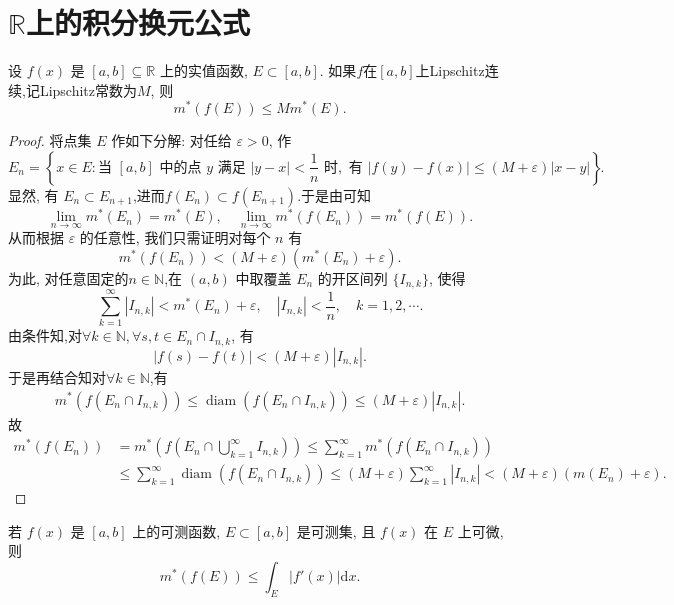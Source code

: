 \documentclass[../../main.tex]{subfiles}%
\begin{document}
\section{$\mathbb{R}$上的积分换元公式}

\begin{lemma}\label{lemma:实变函数--引理5.19}
设 $f(x)$ 是 $[a,b]\subseteq \mathbb{R}$ 上的实值函数, $E\subset[a,b]$. 如果$f$在$[a,b]$上Lipschitz连续,记Lipschitz常数为$M$, 则
\[
m^*(f(E)) \leqslant Mm^*(E). 
\]
\end{lemma}
\begin{proof}
将点集 $E$ 作如下分解: 对任给 $\varepsilon>0$, 作
\[
E_n = \left\{x\in E: \text{当 } [a,b] \text{ 中的点 } y \text{ 满足 } |y-x|<\frac{1}{n} \text{ 时}, \text{ 有 } |f(y)-f(x)|\leqslant(M+\varepsilon)|x-y|\right\}.
\]
显然, 有 $E_n\subset E_{n+1}$,进而$f(E_n)\subset f(E_{n+1})$.于是由可知
\[
\lim_{n\to\infty}m^*(E_n) = m^*(E), \quad \lim_{n\to\infty}m^*(f(E_n)) = m^*(f(E)).
\]
从而根据 $\varepsilon$ 的任意性, 我们只需证明对每个 $n$ 有
\[
m^*(f(E_n)) < (M+\varepsilon)(m^*(E_n)+\varepsilon).
\]
为此, 对任意固定的$n\in \mathbb{N}$,在 $(a,b)$ 中取覆盖 $E_n$ 的开区间列 $\{I_{n,k}\}$, 使得
\[
\sum_{k=1}^{\infty} |I_{n,k}| < m^*(E_n)+\varepsilon, \quad |I_{n,k}| < \frac{1}{n}, \quad k=1,2,\cdots.
\]
由条件知,对$\forall k\in \mathbb{N},\forall s,t\in E_n\cap I_{n,k}$, 有
\[
|f(s)-f(t)| < (M+\varepsilon)|I_{n,k}|.
\]
于是再结合知对$\forall k\in \mathbb{N}$,有
\begin{align*}
m^*(f(E_n\cap I_{n,k}))\leqslant \operatorname{diam}(f(E_n\cap I_{n,k})) 
\leqslant (M+\varepsilon)|I_{n,k}|.
\end{align*}
故
\begin{align*}
m^*(f(E_n)) &= m^*\left(f\left(E_n\cap\bigcup_{k=1}^{\infty} I_{n,k}\right)\right) \leqslant \sum_{k=1}^{\infty} m^*(f(E_n\cap I_{n,k})) \\
&\leqslant \sum_{k=1}^{\infty} \operatorname{diam}(f(E_n\cap I_{n,k})) 
\leqslant (M+\varepsilon)\sum_{k=1}^{\infty} |I_{n,k}| < (M+\varepsilon)(m(E_n)+\varepsilon).
\end{align*}
\end{proof}

\begin{corollary}\label{corollary:可微的可测函数像集外测度小于导数积分}
若 $f(x)$ 是 $[a,b]$ 上的可测函数, $E\subset[a,b]$ 是可测集, 且 $f(x)$ 在 $E$ 上可微, 则
\[
m^*(f(E)) \leqslant \int_E |f'(x)|\mathrm{d}x. \label{5.17}
\]
\end{corollary}
\end{document}
